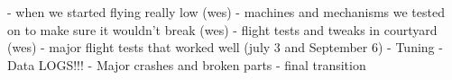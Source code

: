 \color{red}
- when we started flying really low (wes) 
- machines and mechanisms we tested on to make sure it wouldn’t break (wes) 
- flight tests and tweaks in courtyard (wes) 
- major flight tests that worked well (july 3 and September 6) 
- Tuning 
- Data LOGS!!! 
- Major crashes and broken parts 
- final transition
\color{black}